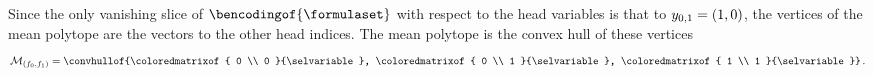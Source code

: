 \begin{example}
    Since the only vanishing slice of $\bencodingof{\formulaset}$ with respect to the head variables is that to $y_{0,1} = (1,0)$, the vertices of the mean polytope are the vectors to the other head indices.
    The mean polytope is the convex hull of these vertices
    \begin{align*}
        \meansetof{(\formulaof{0},\formulaof{1})} =
        \convhullof{\coloredmatrixof{
                        0 \\ 0
        }{\selvariable},
            \coloredmatrixof{
                0 \\ 1
            }{\selvariable},
            \coloredmatrixof{
                1 \\ 1
            }{\selvariable}} \, .
    \end{align*}


\end{example}
